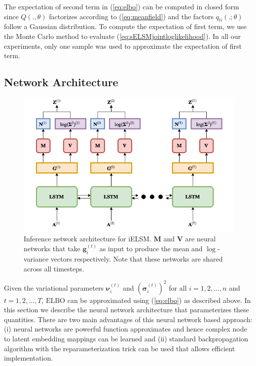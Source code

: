 \documentclass[letterpaper]{article} %
\begin{document}
The expectation of second term in (\ref{eq:elbo}) can be computed in closed form since $Q(., \theta)$ factorizes according to (\ref{eq:meanfield}) and the factors $q_{ti}(.; \theta)$ follow a Gaussian distribution. To compute the expectation of first term, we use the Monte Carlo method to evaluate (\ref{eq:sELSMjointloglikelihood}). In all our experiments, only one sample was used to approximate the expectation of first term.


\subsection{Network Architecture}
\label{section:networkarchitecture}

\begin{figure}
\begin{center}
\centering
\includegraphics[scale=0.35]{network_architecture}
\caption{Inference network architecture for iELSM. $\mathbf{M}$ and $\mathbf{V}$ are neural networks that take $\mathbf{g}_i^{(t)}$ as input to produce the mean and $\log$-variance vectors respectively. Note that these networks are shared across all timesteps.}
\label{fig:networkmodel}
\end{center}
\end{figure}

Given the variational parameters $\bm{\nu}_i^{(t)}$ and ${(\bm{\sigma}_i^{(t)})^2}$ for all ${i} = 1, 2, ..., {n}$ and ${t} = 1, 2, ..., {T}$, $\mathrm{ELBO}$ can be approximated using (\ref{eq:elbo}) as described above. In this section we describe the neural network architecture that parameterizes these quantities. There are two main advantages of this neural network based approach: (i) neural networks are powerful function approximates and hence complex node to latent embedding mappings can be learned and (ii) standard backpropagation algorithm with the reparameterization trick \cite{KingmaEtAl:2013:AutoEncodingVariationalBayes} can be used that allows efficient implementation.
\end{document}
